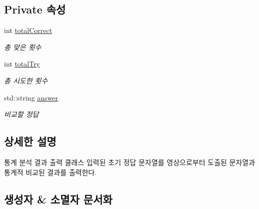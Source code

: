 \subsection*{Private 속성}
\begin{DoxyCompactItemize}
\item 
\mbox{\label{classtools_1_1_analyzer_a8a38c47fc2d716a805f026dea1ea2868}} 
int \hyperlink{classtools_1_1_analyzer_a8a38c47fc2d716a805f026dea1ea2868}{total\+Correct}
\begin{DoxyCompactList}\small\item\em 총 맞은 횟수 \end{DoxyCompactList}\item 
\mbox{\label{classtools_1_1_analyzer_a3e378819a8a7d97b4cffb83cd2cde912}} 
int \hyperlink{classtools_1_1_analyzer_a3e378819a8a7d97b4cffb83cd2cde912}{total\+Try}
\begin{DoxyCompactList}\small\item\em 총 시도한 횟수 \end{DoxyCompactList}\item 
\mbox{\label{classtools_1_1_analyzer_a266409271441e355f817ffe0ffd59250}} 
std\+::string \hyperlink{classtools_1_1_analyzer_a266409271441e355f817ffe0ffd59250}{answer}
\begin{DoxyCompactList}\small\item\em 비교할 정답 \end{DoxyCompactList}\end{DoxyCompactItemize}


\subsection{상세한 설명}
통계 분석 결과 출력 클래스 입력된 초기 정답 문자열를 영상으로부터 도출된 문자열과 통계적 비교된 결과를 출력한다. 

\subsection{생성자 \& 소멸자 문서화}
\mbox{\label{classtools_1_1_analyzer_a6510bc1e10d40e671db16b7a91fc8fac}} 
